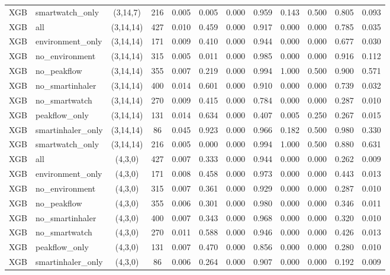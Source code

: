 \begin{longtable}{llcccccccccc}
XGB & smartwatch\_only & (3,14,7) & 216 & 0.005 & 0.005 & 0.000 & 0.959 & 0.143 & 0.500 & 0.805 & 0.093 \\
XGB & all & (3,14,14) & 427 & 0.010 & 0.459 & 0.000 & 0.917 & 0.000 & 0.000 & 0.785 & 0.035 \\
XGB & environment\_only & (3,14,14) & 171 & 0.009 & 0.410 & 0.000 & 0.944 & 0.000 & 0.000 & 0.677 & 0.030 \\
XGB & no\_environment & (3,14,14) & 315 & 0.005 & 0.011 & 0.000 & 0.985 & 0.000 & 0.000 & 0.916 & 0.112 \\
XGB & no\_peakflow & (3,14,14) & 355 & 0.007 & 0.219 & 0.000 & 0.994 & 1.000 & 0.500 & 0.900 & 0.571 \\
XGB & no\_smartinhaler & (3,14,14) & 400 & 0.014 & 0.601 & 0.000 & 0.910 & 0.000 & 0.000 & 0.739 & 0.032 \\
XGB & no\_smartwatch & (3,14,14) & 270 & 0.009 & 0.415 & 0.000 & 0.784 & 0.000 & 0.000 & 0.287 & 0.010 \\
XGB & peakflow\_only & (3,14,14) & 131 & 0.014 & 0.634 & 0.000 & 0.407 & 0.005 & 0.250 & 0.267 & 0.015 \\
XGB & smartinhaler\_only & (3,14,14) & 86 & 0.045 & 0.923 & 0.000 & 0.966 & 0.182 & 0.500 & 0.980 & 0.330 \\
XGB & smartwatch\_only & (3,14,14) & 216 & 0.005 & 0.000 & 0.000 & 0.994 & 1.000 & 0.500 & 0.880 & 0.631 \\
XGB & all & (4,3,0) & 427 & 0.007 & 0.333 & 0.000 & 0.944 & 0.000 & 0.000 & 0.262 & 0.009 \\
XGB & environment\_only & (4,3,0) & 171 & 0.008 & 0.458 & 0.000 & 0.973 & 0.000 & 0.000 & 0.443 & 0.013 \\
XGB & no\_environment & (4,3,0) & 315 & 0.007 & 0.361 & 0.000 & 0.929 & 0.000 & 0.000 & 0.287 & 0.010 \\
XGB & no\_peakflow & (4,3,0) & 355 & 0.006 & 0.301 & 0.000 & 0.980 & 0.000 & 0.000 & 0.346 & 0.011 \\
XGB & no\_smartinhaler & (4,3,0) & 400 & 0.007 & 0.343 & 0.000 & 0.968 & 0.000 & 0.000 & 0.320 & 0.010 \\
XGB & no\_smartwatch & (4,3,0) & 270 & 0.011 & 0.588 & 0.000 & 0.946 & 0.000 & 0.000 & 0.426 & 0.013 \\
XGB & peakflow\_only & (4,3,0) & 131 & 0.007 & 0.470 & 0.000 & 0.856 & 0.000 & 0.000 & 0.280 & 0.010 \\
XGB & smartinhaler\_only & (4,3,0) & 86 & 0.006 & 0.264 & 0.000 & 0.907 & 0.000 & 0.000 & 0.192 & 0.009 \\

\end{longtable}
